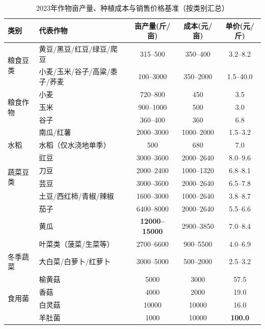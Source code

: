 \documentclass[12pt]{ctexart}
\begin{document}
\begin{table}[H]
\centering
\caption{2023年作物亩产量、种植成本与销售价格基准（按类别汇总）}
\label{tab:baseline_ycp}
\small
\begin{tabular}{@{}llccc@{}}
\toprule
\textbf{类别} & \textbf{代表作物} & \textbf{亩产量(斤/亩)} & \textbf{成本(元/亩)} & \textbf{单价(元/斤)} \\
\midrule
\multirow{2}{*}{粮食豆类} & 黄豆/黑豆/红豆/绿豆/爬豆 & 315--500 & 350--400 & 3.2--8.2 \\
                         & 小麦/玉米/谷子/高粱/黍子/荞麦 & 100--3000 & 350--2000 & 1.5--40.0 \\
\midrule
\multirow{3}{*}{粮食作物} & 小麦 & 720--800 & 450 & 3.5 \\
                         & 玉米 & 900--1000 & 500 & 3.0 \\
                         & 谷子 & 360--400 & 360 & 6.8 \\
                         & 南瓜/红薯 & 2000--3000 & 1000--2000 & 1.5--3.2 \\
\midrule
水稻 & 水稻（仅水浇地单季） & 500 & 680 & 7.0 \\
\midrule
\multirow{4}{*}{蔬菜豆类} & 豇豆 & 3000--3600 & 2000--2640 & 8.0--9.6 \\
                         & 刀豆 & 2000--2400 & 1000--1320 & 6.8--8.1 \\
                         & 芸豆 & 3000--3600 & 2000--2640 & 6.5--7.8 \\
\midrule
\multirow{4}{*}{蔬菜} & 土豆/西红柿/青椒/辣椒 & 1600--3000 & 1000--2640 & 3.8--8.7 \\
                         & 茄子 & 6400--8000 & 2000--2640 & 5.5--6.6 \\
                         & 黄瓜 & \textbf{12000--15000} & 2900--3850 & 7.0--8.4 \\
                         & 叶菜类（菠菜/生菜等） & 2700--6600 & 900--5500 & 4.0--6.9 \\
\midrule
冬季蔬菜 & 大白菜/白萝卜/红萝卜 & 3000--5000 & 500--2000 & 2.5--3.2 \\
\midrule
\multirow{4}{*}{食用菌} & 榆黄菇 & 5000 & 3000 & 57.5 \\
                         & 香菇 & 4000 & 2000 & 19.0 \\
                         & 白灵菇 & 10000 & 10000 & 16.0 \\
                         & 羊肚菌 & 1000 & 10000 & \textbf{100.0} \\
\bottomrule
\end{tabular}
\end{table}
\end{document}
